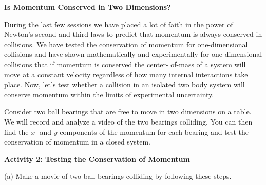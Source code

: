 





\textbf{Is Momentum Conserved in Two Dimensions? }

During the last few sessions we have placed a lot of faith in the power of Newton's
second and third laws to predict that momentum is always conserved in collisions.
We have tested the conservation of momentum for one-dimensional collisions and
have shown mathematically and experimentally for one-dimensional collisions
that if momentum is conserved the center- of-mass of a system will move at a
constant velocity regardless of how many internal interactions take place. Now,
let's test whether a collision in an isolated two body system will conserve
momentum within the limits of experimental uncertainty. 

Consider two ball bearings that are free to move in two dimensions on a table.
We will record and analyze a video of the two bearings colliding. You can then
find the $x$- and $y$-components of the momentum for each bearing and test the 
conservation of momentum in a closed system. 

\textbf{Activity 2: Testing the Conservation of Momentum }

(a) Make a movie of two ball bearings colliding by following these steps. 

